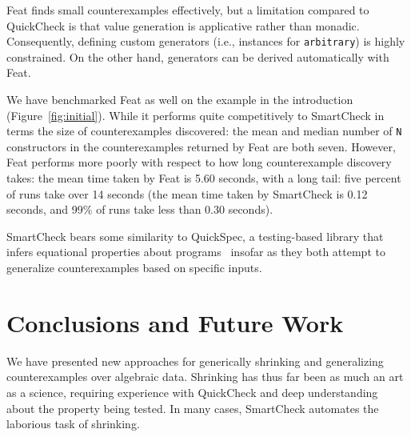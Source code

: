 \documentclass{sigplanconf}
\newcommand{\ttp}[1]{\texttt{#1}}
\begin{document}
Feat finds small counterexamples effectively, but a limitation compared to
QuickCheck is that value generation is applicative rather than monadic.
Consequently, defining custom generators (i.e., instances for \ttp{arbitrary})
is highly constrained.  On the other hand, generators can be derived
automatically with Feat.

We have benchmarked Feat as well on the example in the introduction
(Figure~\ref{fig:initial}).  While it performs quite competitively to SmartCheck
in terms the size of counterexamples discovered: the mean and median number of
\ttp{N} constructors in the counterexamples returned by Feat are both seven.
However, Feat performs more poorly with respect to how long counterexample
discovery takes: the mean time taken by Feat is 5.60 seconds, with a long tail:
five percent of runs take over 14 seconds (the mean time taken by
SmartCheck is 0.12 seconds, and 99\% of runs take less than 0.30 seconds).

SmartCheck bears some similarity to QuickSpec, a testing-based library that
infers equational properties about programs~\cite{qs} insofar as they both
attempt to generalize counterexamples based on specific inputs.



\section{Conclusions and Future Work}\label{sec:conclusions}

We have presented new approaches for generically shrinking and generalizing
counterexamples over algebraic data.  Shrinking has thus far been as much an art
as a science, requiring experience with QuickCheck and deep understanding about
the property being tested.  In many cases, SmartCheck automates the laborious
task of shrinking.
\end{document}

